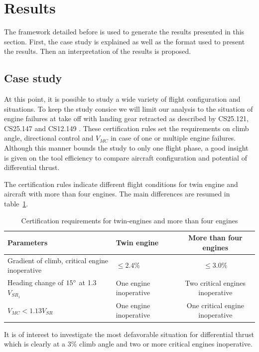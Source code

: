 \section{Results} \label{Results}
The framework detailed before is used to generate the results presented in this section. First, the case study is explained as well as the format used to present the results. Then an interpretation of the results is proposed.

\subsection{Case study}
At this point, it is possible to study a wide variety of flight configuration and situations. To keep the study consice we will limit our analysis to the situation of engine failures at take off with landing gear retracted as described by CS25.121, CS25.147 and CS12.149 \cite{CS25}. These certification rules set the requirements on climb angle, directional control and $V_{MC}$ in case of one or multiple engine failures. Although this manner bounds the study to only one flight phase, a good insight is given on the tool efficiency to compare aircraft configuration and potential of differential thrust.

The certification rules indicate different flight conditions for twin engine and aircraft with more than four engines. The main differences are resumed in table~\ref{tab:DiffTwinMulti}. %
\begin{table}[hbt]
	\caption{\label{tab:DiffTwinMulti} Certification requirements for twin-engines and more than four engines \cite{CS25}} 
	\centering
	\begin{tabular}{l|l|c}
		Parameters & Twin engine & More than four engines\\
		\hline
		Gradient of climb, critical engine inoperative & $\leq 2.4\%$ & $\leq 3.0\%$\\
		Heading change of $15\degree$ at 1.3$V_{SR_1}$& One engine inoperative & Two critical engines inoperative\\
		$V_{MC} < 1.13 V_{SR}$ & One engine inoperative & One critical engine inoperative \\
	\end{tabular}
\end{table}

It is of interest to investigate the most defavorable situation for differential thrust which is clearly at a $3\%$ climb angle and two or more critical engines inoperative. 

